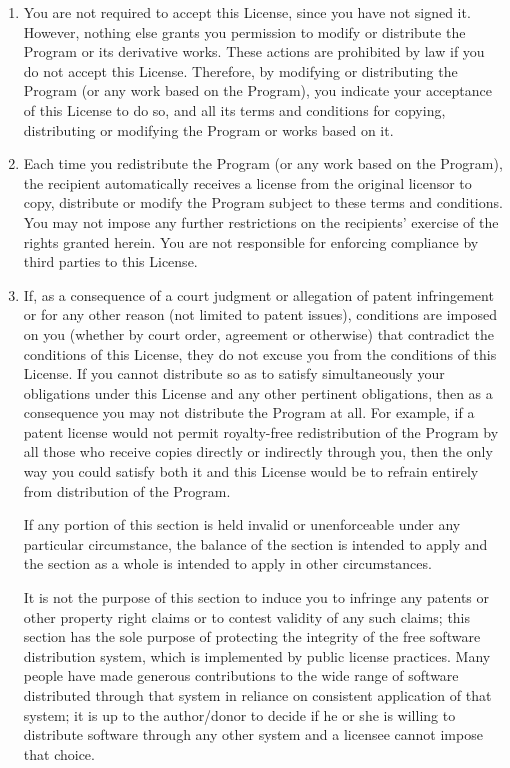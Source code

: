 \documentclass{article}
\begin{document}
\begin{enumerate}
\item
You are not required to accept this License, since you have not
signed it.  However, nothing else grants you permission to modify or
distribute the Program or its derivative works.  These actions are
prohibited by law if you do not accept this License.  Therefore, by
modifying or distributing the Program (or any work based on the
Program), you indicate your acceptance of this License to do so, and
all its terms and conditions for copying, distributing or modifying
the Program or works based on it.

\item
Each time you redistribute the Program (or any work based on the
Program), the recipient automatically receives a license from the
original licensor to copy, distribute or modify the Program subject to
these terms and conditions.  You may not impose any further
restrictions on the recipients' exercise of the rights granted herein.
You are not responsible for enforcing compliance by third parties to
this License.

\item
If, as a consequence of a court judgment or allegation of patent
infringement or for any other reason (not limited to patent issues),
conditions are imposed on you (whether by court order, agreement or
otherwise) that contradict the conditions of this License, they do not
excuse you from the conditions of this License.  If you cannot
distribute so as to satisfy simultaneously your obligations under this
License and any other pertinent obligations, then as a consequence you
may not distribute the Program at all.  For example, if a patent
license would not permit royalty-free redistribution of the Program by
all those who receive copies directly or indirectly through you, then
the only way you could satisfy both it and this License would be to
refrain entirely from distribution of the Program.

If any portion of this section is held invalid or unenforceable under
any particular circumstance, the balance of the section is intended to
apply and the section as a whole is intended to apply in other
circumstances.

It is not the purpose of this section to induce you to infringe any
patents or other property right claims or to contest validity of any
such claims; this section has the sole purpose of protecting the
integrity of the free software distribution system, which is
implemented by public license practices.  Many people have made
generous contributions to the wide range of software distributed
through that system in reliance on consistent application of that
system; it is up to the author/donor to decide if he or she is willing
to distribute software through any other system and a licensee cannot
impose that choice.


\end{enumerate}
\end{document}
